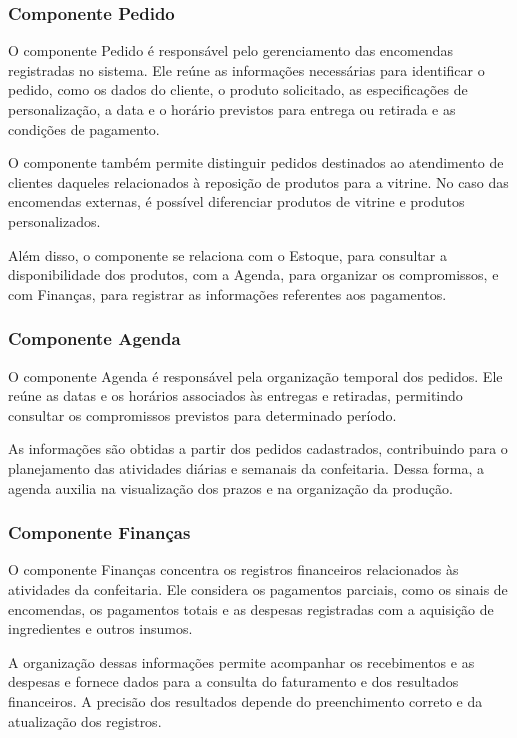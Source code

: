 \subsubsection{Componente Pedido}

O componente Pedido é responsável pelo gerenciamento das encomendas registradas no sistema. Ele reúne as informações necessárias para identificar o pedido, como os dados do cliente, o produto solicitado, as especificações de personalização, a data e o horário previstos para entrega ou retirada e as condições de pagamento.

O componente também permite distinguir pedidos destinados ao atendimento de clientes daqueles relacionados à reposição de produtos para a vitrine. No caso das encomendas externas, é possível diferenciar produtos de vitrine e produtos personalizados.

Além disso, o componente se relaciona com o Estoque, para consultar a disponibilidade dos produtos, com a Agenda, para organizar os compromissos, e com Finanças, para registrar as informações referentes aos pagamentos.

\subsubsection{Componente Agenda}

O componente Agenda é responsável pela organização temporal dos pedidos. Ele reúne as datas e os horários associados às entregas e retiradas, permitindo consultar os compromissos previstos para determinado período.

As informações são obtidas a partir dos pedidos cadastrados, contribuindo para o planejamento das atividades diárias e semanais da confeitaria. Dessa forma, a agenda auxilia na visualização dos prazos e na organização da produção.

\subsubsection{Componente Finanças}

O componente Finanças concentra os registros financeiros relacionados às atividades da confeitaria. Ele considera os pagamentos parciais, como os sinais de encomendas, os pagamentos totais e as despesas registradas com a aquisição de ingredientes e outros insumos.

A organização dessas informações permite acompanhar os recebimentos e as despesas e fornece dados para a consulta do faturamento e dos resultados financeiros. A precisão dos resultados depende do preenchimento correto e da atualização dos registros.

